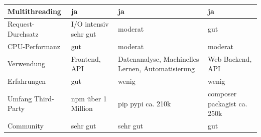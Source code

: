 \begin{table}[H]
\begin{tabular}{|p{3cm}|p{3.7cm}|p{3.7cm}|p{3.7cm}|}
    Multithreading                                                                               & ja                                                                                 & ja                                                      & ja                                                                                                 \\ \hline
    Request-Durchsatz \cite{mihai_benchmark,tandemseven_perf,techempower_benchmark,benchmark_web,medium_awslambda,acloud_awslambda}                                                                           & I/O intensiv sehr gut \cite{performance_io}                                                              & moderat                                                 & gut                                                                                                \\ \hline
    CPU-Performanz \cite{benchmark_game,benchmark_kostya}                                                                               & gut                                                                                & moderat                                                 & moderat                                                                                            \\ \hline
    Verwendung                                                                        & Frontend, API                                                                      & Datenanalyse, Machinelles Lernen, Automatisierung     & Web Backend, API                                                                                   \\ \hline
    Erfahrungen                                                                                  & gut                                                                                & wenig                                                   & wenig                                                                                              \\ \hline
    Umfang Third-Party                                                                           & npm über 1 Million \cite{js_packages}                                    & pip pypi ca. 210k \cite{python_packages}              & composer packagist ca. 250k \cite{php_packages}                                \\ \hline
    Community \cite{stackoverflow_survey,tiobe,pypl,github_octoverse,redmonk}                                                                                    & sehr gut                                                                           & sehr gut                                                & gut                                                                                                \\ \hline

\end{tabular}
\end{table}
